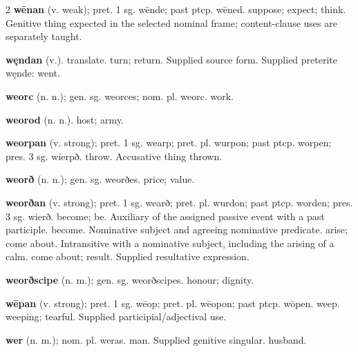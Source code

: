 \begin{multicols*}{2}
\textbf{wēnan} (v. weak); pret. 1 sg. wēnde; past ptcp. wēned. suppose; expect; think. Genitive thing expected in the selected nominal frame; content-clause uses are separately taught.\par
\textbf{węndan} (v.). translate. turn; return. Supplied source form. Supplied preterite węnde: went.\par
\textbf{weorc} (n. n.); gen. sg. weorces; nom. pl. weorc. work.\par
\textbf{weorod} (n. n.). host; army.\par
\textbf{weorpan} (v. strong); pret. 1 sg. wearp; pret. pl. wurpon; past ptcp. worpen; pres. 3 sg. wierpð. throw. Accusative thing thrown.\par
\textbf{weorð} (n. n.); gen. sg. weorðes. price; value.\par
\textbf{weorðan} (v. strong); pret. 1 sg. wearð; pret. pl. wurdon; past ptcp. worden; pres. 3 sg. wierð. become; be. Auxiliary of the assigned passive event with a past participle. become. Nominative subject and agreeing nominative predicate. arise; come about. Intransitive with a nominative subject, including the arising of a calm. come about; result. Supplied resultative expression.\par
\textbf{weorðscipe} (n. m.); gen. sg. weorðscipes. honour; dignity.\par
\textbf{wēpan} (v. strong); pret. 1 sg. wēop; pret. pl. wēopon; past ptcp. wōpen. weep. weeping; tearful. Supplied participial/adjectival use.\par
\textbf{wer} (n. m.); nom. pl. weras. man. Supplied genitive singular. husband.\par

\end{multicols*}
